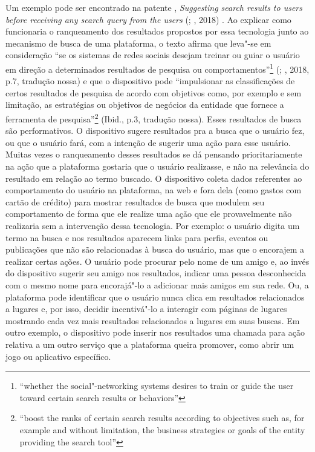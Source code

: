 Um exemplo pode ser encontrado na patente , \emph{Suggesting
search results to users before receiving any search query from the
users} (; , 2018) . Ao explicar como funcionaria o
ranqueamento dos resultados propostos por essa tecnologia junto ao
mecanismo de busca de uma plataforma, o texto afirma que leva"-se em
consideração ``se os sistemas de redes sociais desejam treinar ou guiar
o usuário em direção a determinados resultados de pesquisa ou
comportamentos''\footnote{``whether the social"-networking systems
  desires to train or guide the user toward certain search results or
  behaviors''} (; , 2018, p.7, tradução nossa) e que o
dispositivo pode ``impulsionar as classificações de certos resultados de
pesquisa de acordo com objetivos como, por exemplo e sem limitação, as
estratégias ou objetivos de negócios da entidade que fornece a
ferramenta de pesquisa''\footnote{``boost the ranks of certain search
  results according to objectives such as, for example and without
  limitation, the business strategies or goals of the entity providing
  the search tool''} (Ibid., p.3, tradução nossa). Esses resultados de
busca são performativos. O dispositivo sugere resultados pra a busca que
o usuário fez, ou que o usuário fará, com a intenção de sugerir uma ação
para esse usuário. Muitas vezes o ranqueamento desses resultados se dá
pensando prioritariamente na ação que a plataforma gostaria que o
usuário realizasse, e não na relevância do resultado em relação ao termo
buscado. O dispositivo coleta dados referentes ao comportamento do
usuário na plataforma, na web e fora dela (como gastos com cartão de
crédito) para mostrar resultados de busca que modulem seu comportamento
de forma que ele realize uma ação que ele provavelmente não realizaria
sem a intervenção dessa tecnologia. Por exemplo: o usuário digita um
termo na busca e nos resultados aparecem links para perfis, eventos ou
publicações que não são relacionadas à busca do usuário, mas que o
encorajem a realizar certas ações. O usuário pode procurar pelo nome de
um amigo e, ao invés do dispositivo sugerir seu amigo nos resultados,
indicar uma pessoa desconhecida com o mesmo nome para encorajá"-lo a
adicionar mais amigos em sua rede. Ou, a plataforma pode identificar que
o usuário nunca clica em resultados relacionados a lugares e, por isso,
decidir incentivá"-lo a interagir com páginas de lugares mostrando cada
vez mais resultados relacionados a lugares em suas buscas. Em outro
exemplo, o dispositivo pode inserir nos resultados uma chamada para ação
relativa a um outro serviço que a plataforma queira promover, como abrir
um jogo ou aplicativo específico.

